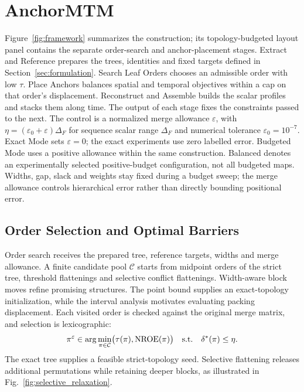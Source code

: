\begin{figure}[!tb]
\end{figure}
\section{AnchorMTM}\label{sec:method}\label{sec:construction}

Figure~\ref{fig:framework} summarizes the construction; its topology-budgeted layout panel contains the separate order-search and anchor-placement stages. Extract and Reference prepares the trees, identities and fixed targets defined in Section~\ref{sec:formulation}. Search Leaf Orders chooses an admissible order with low $\tau$. Place Anchors balances spatial and temporal objectives within a cap on that order's displacement. Reconstruct and Assemble builds the scalar profiles and stacks them along time. The output of each stage fixes the constraints passed to the next. The control is a normalized merge allowance $\varepsilon$, with $\eta=(\varepsilon_0+\varepsilon)\Delta_F$ for sequence scalar range $\Delta_F$ and numerical tolerance $\varepsilon_0=10^{-7}$. Exact Mode sets $\varepsilon=0$; the exact experiments use zero labelled error. Budgeted Mode uses a positive allowance within the same construction. Balanced denotes an experimentally selected positive-budget configuration, not all budgeted maps. Widths, gap, slack and weights stay fixed during a budget sweep; the merge allowance controls hierarchical error rather than directly bounding positional error.

\subsection{Order Selection and Optimal Barriers}
Order search receives the prepared tree, reference targets, widths and merge allowance. A finite candidate pool $\mathcal C$ starts from midpoint orders of the strict tree, threshold flattenings and selective conflict flattenings. Width-aware block moves refine promising structures. The point bound supplies an exact-topology initialization, while the interval analysis motivates evaluating packing displacement. Each visited order is checked against the original merge matrix, and selection is lexicographic:
\begin{equation}\label{eq:orderobjective}
\pi^\varepsilon\in\arg\min_{\pi\in\mathcal C}\bigl(\tau(\pi),\mathrm{NROE}(\pi)\bigr)
\quad\mathrm{s.t.}\quad\delta^*(\pi)\le\eta.
\end{equation}
The exact tree supplies a feasible strict-topology seed. Selective flattening releases additional permutations while retaining deeper blocks, as illustrated in Fig.~\ref{fig:selective_relaxation}.


